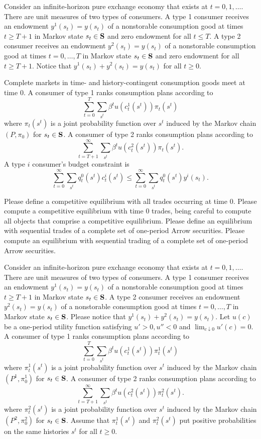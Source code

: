 \medskip
{} Consider an infinite-horizon pure exchange economy that exists at $t=0, 1, \ldots $.
There are unit measures of  two types of consumers.
A type 1 consumer receives an endowment $y^1(s_t) = y(s_t)$ of a nonstorable consumption good at times $t\geq T+1$
in Markov state $s_t \in {\bf S}$ and zero endowment for all $ t \leq T$.  A type 2 consumer receives an endowment $y^2(s_t) = y(s_t)$ of a nonstorable consumption good at times $t =0, \ldots, T$
in Markov state $s_t \in {\bf S}$ and zero endowment for all $t \geq T+1$.  Notice that $y^1(s_t) + y^2(s_t) = y(s_t)$ for all $t \geq 0$.

Complete markets in time- and  history-contingent consumption goods
meet at time $0$. A consumer of type 1  ranks consumption plans according to 
$$ \sum_{t=0}^T \sum_{s^t} \beta^t u(c_t^1(s^t)) \pi_t(s^t)$$
where $\pi_t(s^t)$ is a joint probability function over $s^t$ induced by the Markov chain $(P, \pi_0)$ for $s_t \in 
{\bf S}$.
A consumer of type 2 ranks consumption plans according to 
$$ \sum_{t=T+1}^\infty \sum_{s^t} \beta^t u(c_t^2(s^t)) \pi_t(s^t) .$$
A type $i$ consumer's budget constraint is
$$ \sum_{t=0}^\infty \sum_{s^t} q_t^0(s^t) c^i_t(s^t) \leq  \sum_{t=0}^\infty \sum_{s^t} q_t^0(s^t) y^i(s_t) . $$
 
\medskip
{} Please define a competitive equilibrium with all trades occurring at time $0$.
\medskip
{} Please compute a competitive equilibrium with time $0$ trades, being careful to compute
all objects that comprise a competitive equilibrium.
\medskip
{} Please define an equilibrium with sequential trades of a complete set of one-period Arrow  securities.
\medskip
{} Please compute an equilibrium with sequential trading of a complete set of one-period Arrow securities.



\medskip
{} Consider an infinite-horizon pure exchange economy that exists at $t=0, 1, \ldots $.
There are unit measures of  two types of consumers.
A type 1 consumer receives an endowment $y^1(s_t) = y(s_t)$ of a nonstorable consumption good at times $t\geq T+1$
in Markov state $s_t \in {\bf S}$.  A type 2 consumer receives an endowment $y^2(s_t) = y(s_t)$ of a nonstorable consumption good at times $t =0, \ldots, T$
in Markov state $s_t \in {\bf S}$. Please notice that $y^1(s_t) + y^2(s_t) = y(s_t)$.
Let $u(c)$ be a one-period utility 
function satisfying $u' > 0, u'' < 0$ and $\lim_{c \downarrow 0} u'(c) = 0$.
 A consumer of type 1  ranks consumption plans according to 
$$ \sum_{t=0}^T \sum_{s^t} \beta^t u(c_t^1(s^t)) \pi^1_t(s^t)$$
where $\pi^1_t(s^t)$ is a joint probability function over $s^t$ induced by the Markov chain $(P^1, \pi^1_0)$ for $s_t
\in {\bf S}$.
A consumer of type 2 ranks consumption plans according to 
$$ \sum_{t=T+1}^\infty \sum_{s^t} \beta^t u(c_t^2(s^t)) \pi^2_t(s^t) .$$
where $\pi^2_t(s^t)$ is a joint probability function over $s^t$ induced by the Markov chain $(P^2, \pi^2_0)$ for $s_t
\in {\bf S}$.
Assume that $\pi^1_t(s^t)$ and $\pi^2_t(s^t)$ put positive probabilities on the same histories $s^t$ for all $t\geq 0$.

